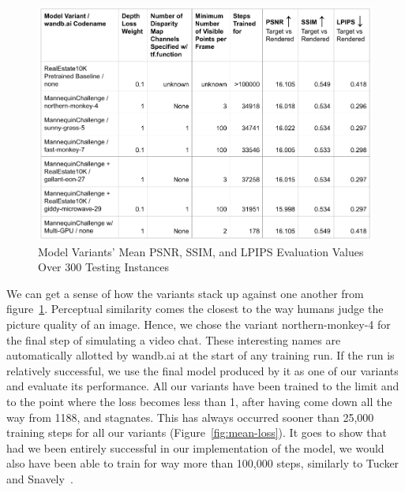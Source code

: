 \begin{figure}[!h]
    \includegraphics[width=1\columnwidth]{figures/model-variants-metrics.png}
    \caption{Model Variants' Mean PSNR, SSIM, and LPIPS Evaluation Values Over 300 Testing Instances}
    \label{fig:model-variants-metrics}
\end{figure}

We can get a sense of how the variants stack up against one another from figure~\ref{fig:model-variants-metrics}. Perceptual similarity comes the closest to the way humans judge the picture quality of an image. Hence, we chose the variant northern-monkey-4 for the final step of simulating a video chat. These interesting names are automatically allotted by wandb.ai at the start of any training run. If the run is relatively successful, we use the final model produced by it as one of our variants and evaluate its performance. All our variants have been trained to the limit and to the point where the loss becomes less than 1, after having come down all the way from 1188, and stagnates. This has always occurred sooner than 25,000 training steps for all our variants (Figure~\ref{fig:mean-loss}). It goes to show that had we been entirely successful in our implementation of the model, we would also have been able to train for way more than 100,000 steps, similarly to Tucker and Snavely~\cite{single_view_mpi}. 

